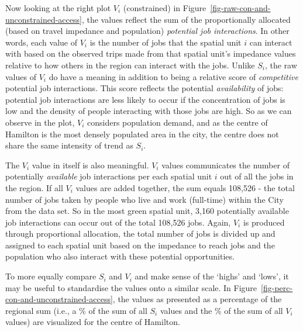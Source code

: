 \documentclass[12pt, oneside]{report}
\begin{document}
Now looking at the right plot \(V_i\) (constrained) in
Figure~\ref{fig-raw-con-and-unconstrained-access}, the values reflect
the sum of the proportionally allocated (based on travel impedance and
population) \emph{potential job interactions}. In other words, each
value of \(V_i\) is the number of jobs that the spatial unit \(i\) can
interact with based on the observed trips made from that spatial unit's
impedance values relative to how others in the region can interact with
the jobs. Unlike \(S_i\), the raw values of \(V_i\) do have a meaning in
addition to being a relative score of \emph{competitive} potential job
interactions. This score reflects the potential \emph{availability} of
jobs: potential job interactions are less likely to occur if the
concentration of jobs is low and the density of people interacting with
those jobs are high. So as we can observe in the plot, \(V_i\) considers
population demand, and as the centre of Hamilton is the most densely
populated area in the city, the centre does not share the same intensity
of trend as \(S_i\).

The \(V_i\) value in itself is also meaningful. \(V_i\) values
communicates the number of potentially \emph{available} job interactions
per each spatial unit \(i\) out of all the jobs in the region. If all
\(V_i\) values are added together, the sum equals 108,526 - the total
number of jobs taken by people who live and work (full-time) within the
City from the data set. So in the most green spatial unit, 3,160
potentially available job interactions can occur out of the total
108,526 jobs. Again, \(V_i\) is produced through proportional
allocation, the total number of jobs is divided up and assigned to each
spatial unit based on the impedance to reach jobs and the population who
also interact with these potential opportunities.

To more equally compare \(S_i\) and \(V_i\) and make sense of the
`highs' and `lows', it may be useful to standardise the values onto a
similar scale. In Figure~\ref{fig-perc-con-and-unconstrained-access},
the values as presented as a percentage of the regional sum (i.e., a \%
of the sum of all \(S_i\) values and the \% of the sum of all \(V_i\)
values) are visualized for the centre of Hamilton.
\end{document}
